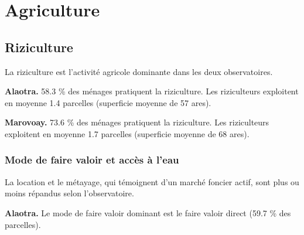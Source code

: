 \documentclass[
  french,
  letterpaper,
]{report}
\begin{document}
\section{Agriculture}\label{sec-agriculture}

\subsection{Riziculture}\label{sec-riziculture}

La riziculture est l'activité agricole dominante dans les deux
observatoires.

\textbf{Alaotra.} 58.3 \% des ménages pratiquent la riziculture. Les
riziculteurs exploitent en moyenne 1.4 parcelles (superficie moyenne de
57 ares).

\textbf{Marovoay.} 73.6 \% des ménages pratiquent la riziculture. Les
riziculteurs exploitent en moyenne 1.7 parcelles (superficie moyenne de
68 ares).

\begin{table}

\caption{\label{tbl-pratique-riz}Pratique de la riziculture par
observatoire (\% des ménages)}


\end{table}%

\subsubsection{Mode de faire valoir et accès à
l'eau}\label{mode-de-faire-valoir-et-accuxe8s-uxe0-leau}

La location et le métayage, qui témoignent d'un marché foncier actif,
sont plus ou moins répandus selon l'observatoire.

\textbf{Alaotra.} Le mode de faire valoir dominant est le faire valoir
direct (59.7 \% des parcelles).
\end{document}

